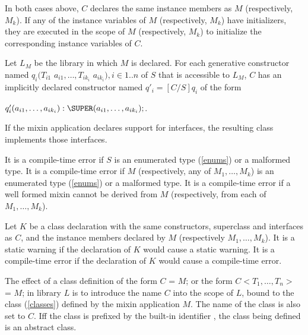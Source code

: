 \documentclass{article}
\newcommand{\code}[1]{{\sf #1}}
\begin{document}
\LMHash{}
In both cases above, $C$ declares the same instance members as $M$ (respectively, $M_k$).
If any of the instance variables of $M$ (respectively, $M_k$) have initializers, they are executed in the scope of $M$ (respectively, $M_k$) to initialize the corresponding instance variables of $C$.

\LMHash{}
Let $L_M$ be the library in which $M$ is declared.
For each generative constructor named $q_i(T_{i1}$ $ a_{i1}, \ldots , T_{ik_i}$ $ a_{ik_i}), i \in 1..n$ of $S$ that is accessible to $L_M$, $C$ has an implicitly declared constructor named
$q'_i = [C/S]q_i$ of the form

$q'_i(a_{i1}, \ldots , a_{ik_i}):\SUPER(a_{i1}, \ldots , a_{ik_i});$.


\LMHash{}
If the mixin application declares support for interfaces, the resulting class implements those interfaces.

\LMHash{}
It is a compile-time error if $S$ is an enumerated type (\ref{enums}) or a malformed type. It is a compile-time error if $M$ (respectively, any of $M_1, \ldots, M_k$) is an enumerated type (\ref{enums}) or a malformed type. It is a compile-time error if a well formed mixin cannot be derived from $M$ (respectively, from each of $M_1, \ldots, M_k$).

\LMHash{}
Let $K$ be a class declaration  with the same constructors, superclass and interfaces as $C$,  and the instance members declared by $M$ (respectively $M_1, \ldots, M_k$). It is a static warning if the declaration of $K$ would cause a static warning.  It is a compile-time error if the declaration of $K$ would cause a compile-time error.


\LMHash{}
The effect of a class definition of the form \code{\CLASS{} $C$ = $M$; } or the form \code{\CLASS{} $C<T_1, \ldots, T_n>$ = $M$; } in library $L$  is to introduce the name $C$ into the scope of $L$, bound to the class (\ref{classes}) defined by the mixin application $M$. The name of the class is also set to $C$. Iff the  class is prefixed by the built-in identifier \ABSTRACT{}, the class being defined is an abstract class.
\end{document}
